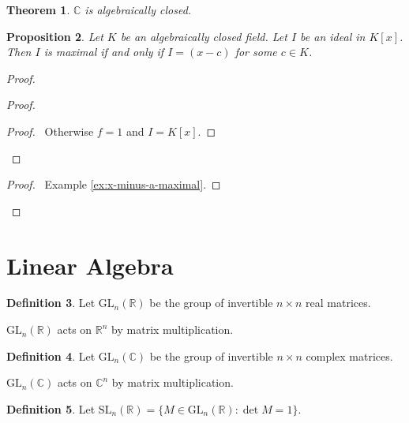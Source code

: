 \documentclass{book}
\let\qed\relax
\newtheorem{prop}{Proposition}[chapter]
\newtheorem{thm}[prop]{Theorem}
\theoremstyle{definition}
\newtheorem{df}[prop]{Definition}
\begin{document}
\begin{thm}
$\mathbb{C}$ is algebraically closed.
\end{thm}


\begin{prop}
Let $K$ be an algebraically closed field. Let $I$ be an ideal in $K[x]$. Then $I$ is maximal if and only if $I = (x-c)$ for some $c \in K$.
\end{prop}

\begin{proof}
\pf
{}
\begin{proof}
	\begin{proof}
		\pf\ Otherwise $f = 1$ and $I = K[x]$.
	\end{proof}
\end{proof}
\begin{proof}
	\pf\ Example \ref{ex:x-minus-a-maximal}.
\end{proof}
\qed
\end{proof}

\part{Linear Algebra}

\begin{df}
    Let $\mathrm{GL}_n(\mathbb{R})$ be the group of invertible $n \times n$ real matrices.
    
    $\mathrm{GL}_n(\mathbb{R})$ acts on $\mathbb{R}^n$ by matrix multiplication.
\end{df}

\begin{df}
    Let $\mathrm{GL}_n(\mathbb{C})$ be the group of invertible $n \times n$ complex matrices.
    
    $\mathrm{GL}_n(\mathbb{C})$ acts on $\mathbb{C}^n$ by matrix multiplication.
\end{df}

\begin{df}
Let $\mathrm{SL}_n(\mathbb{R}) = \{ M \in \mathrm{GL}_n(\mathbb{R}) : \det M = 1 \}$.
\end{df}
\end{document}
